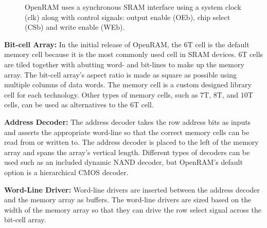 \begin{figure}[tb]
\centering
{}
\caption{OpenRAM uses a synchronous SRAM interface using a system
  clock (clk) along with control signals: output enable (OEb), chip
  select (CSb) and write enable (WEb).}
\label{fig:timing}
\end{figure}

{\bf Bit-cell Array:} In the initial release of OpenRAM, the $6$T cell
is the default memory cell because it is the most commonly used cell
in SRAM devices. $6$T cells are tiled together with abutting word- and
bit-lines to make up the memory array.  The bit-cell array's aspect
ratio is made as square as possible using multiple columns of data
words. The memory cell is a custom designed library cell for each technology.
Other types of memory cells, such as $7$T, $8$T, and $10$T cells, can be used
as alternatives to the $6$T cell.

{\bf Address Decoder:} The address decoder takes the row address bits
as inputs and asserts the appropriate word-line so that the correct
memory cells can be read from or written to. The address decoder is
placed to the left of the memory array and spans the array's vertical
length. Different types of decoders can be used such as an included
dynamic NAND decoder, but OpenRAM's default option is a hierarchical CMOS
decoder.

{\bf Word-Line Driver:} Word-line drivers are inserted between the
address decoder and the memory array as buffers. The word-line drivers
are sized based on the width of the memory array so that they can drive
the row select signal across the bit-cell array.

